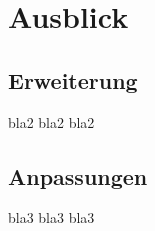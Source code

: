 \section{Ausblick}\label{ausblick}

	\subsection{Erweiterung}
	bla2 bla2 bla2
	
	\subsection{Anpassungen}
	bla3 bla3 bla3